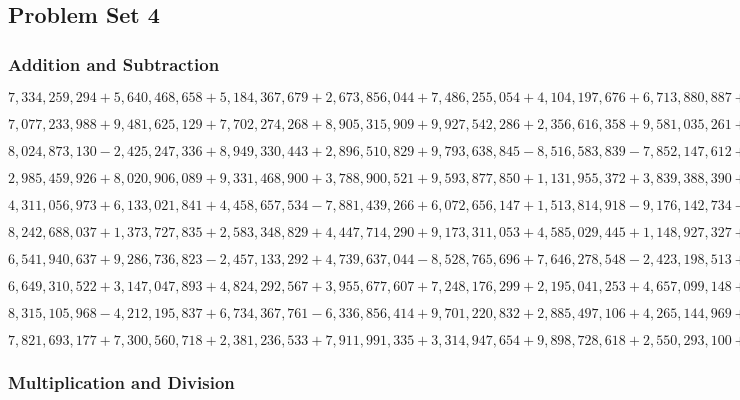 \hypertarget{problem-set-4-6}{%
\subsection{Problem Set 4}\label{problem-set-4-6}}

\hypertarget{addition-and-subtraction-384}{%
\subsubsection{Addition and
Subtraction}\label{addition-and-subtraction-384}}

\(7,334,259,294+5,640,468,658+5,184,367,679+2,673,856,044+7,486,255,054+4,104,197,676+6,713,880,887+3,662,713,367+9,316,869,722+3,244,191,946\)

\(7,077,233,988+9,481,625,129+7,702,274,268+8,905,315,909+9,927,542,286+2,356,616,358+9,581,035,261+1,990,786,433+2,678,912,190+9,818,542,503\)

\(8,024,873,130-2,425,247,336+8,949,330,443+2,896,510,829+9,793,638,845-8,516,583,839-7,852,147,612+9,730,481,759+1,360,205,400-3,917,453,134\)

\(2,985,459,926+8,020,906,089+9,331,468,900+3,788,900,521+9,593,877,850+1,131,955,372+3,839,388,390+2,174,455,892+6,283,171,002+2,449,221,366\)

\(4,311,056,973+6,133,021,841+4,458,657,534-7,881,439,266+6,072,656,147+1,513,814,918-9,176,142,734-3,653,022,884+8,075,579,545-6,915,958,006\)

\(8,242,688,037+1,373,727,835+2,583,348,829+4,447,714,290+9,173,311,053+4,585,029,445+1,148,927,327+5,489,235,829+8,716,781,220+3,603,555,954\)

\(6,541,940,637+9,286,736,823-2,457,133,292+4,739,637,044-8,528,765,696+7,646,278,548-2,423,198,513+6,951,274,450-9,186,145,677+2,584,971,607\)

\(6,649,310,522+3,147,047,893+4,824,292,567+3,955,677,607+7,248,176,299+2,195,041,253+4,657,099,148+1,747,217,220+6,104,626,210+3,826,176,378\)

\(8,315,105,968-4,212,195,837+6,734,367,761-6,336,856,414+9,701,220,832+2,885,497,106+4,265,144,969+3,707,768,744-7,384,745,352-1,741,990,976\)

\(7,821,693,177+7,300,560,718+2,381,236,533+7,911,991,335+3,314,947,654+9,898,728,618+2,550,293,100+5,034,438,894+8,357,772,642+2,391,068,419\)

\hypertarget{multiplication-and-division-382}{%
\subsubsection{Multiplication and
Division}\label{multiplication-and-division-382}}

